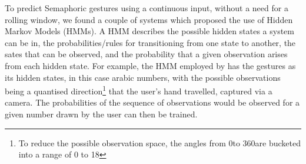 To predict Semaphoric gestures using a continuous input, without a need for a rolling window, we found a couple of systems which proposed the use of Hidden Markov Models (HMMs)\cite{elmezain2008hidden, terven2014robust}.
A HMM describes the possible hidden states a system can be in, the probabilities/rules for transitioning from one state to another, the sates that can be observed, and the probability that a given observation arises from each hidden state.
For example, the HMM employed by \citeauthor{elmezain2008hidden}\cite{elmezain2008hidden} has the gestures as its hidden states, in this case arabic numbers, with the possible observations being a quantised direction\footnote{To reduce the possible observation space, the angles from 0\textdegree to 360\textdegree are bucketed into a range of 0 to 18} that the user's hand travelled, captured via a camera. The probabilities of the sequence of observations would be observed for a given number drawn by the user can then be trained.







